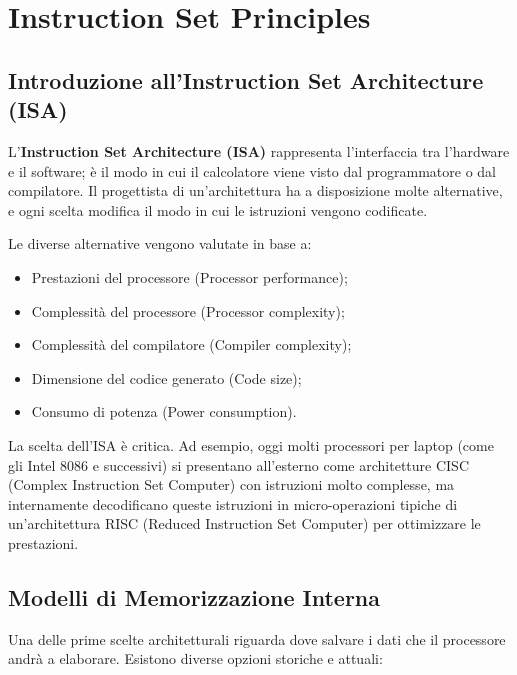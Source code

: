\chapter{Instruction Set Principles}

\section{Introduzione all'Instruction Set Architecture (ISA)}
L'\textbf{Instruction Set Architecture (ISA)} rappresenta l'interfaccia tra l'hardware e il software; è il modo in cui il calcolatore viene visto dal programmatore o dal compilatore. 
Il progettista di un'architettura ha a disposizione molte alternative, e ogni scelta modifica il modo in cui le istruzioni vengono codificate. 

Le diverse alternative vengono valutate in base a:
\begin{itemize}
    \item Prestazioni del processore (Processor performance);
    \item Complessità del processore (Processor complexity);
    \item Complessità del compilatore (Compiler complexity);
    \item Dimensione del codice generato (Code size);
    \item Consumo di potenza (Power consumption).
\end{itemize}

\begin{remark}
La scelta dell'ISA è critica. Ad esempio, oggi molti processori per laptop (come gli Intel 8086 e successivi) si presentano all'esterno come architetture CISC (Complex Instruction Set Computer) con istruzioni molto complesse, ma internamente decodificano queste istruzioni in micro-operazioni tipiche di un'architettura RISC (Reduced Instruction Set Computer) per ottimizzare le prestazioni.
\end{remark}

\section{Modelli di Memorizzazione Interna}
Una delle prime scelte architetturali riguarda dove salvare i dati che il processore andrà a elaborare. Esistono diverse opzioni storiche e attuali:

